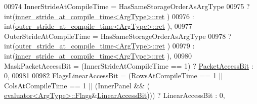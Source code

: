 \begin{DoxyCode}
00974     InnerStrideAtCompileTime = HasSameStorageOrderAsArgType
00975                              ? int(\hyperlink{struct_eigen_1_1internal_1_1inner__stride__at__compile__time}{inner\_stride\_at\_compile\_time<ArgType>::ret}
      )
00976                              : int(\hyperlink{struct_eigen_1_1internal_1_1outer__stride__at__compile__time}{outer\_stride\_at\_compile\_time<ArgType>::ret}
      ),
00977     OuterStrideAtCompileTime = HasSameStorageOrderAsArgType
00978                              ? int(\hyperlink{struct_eigen_1_1internal_1_1outer__stride__at__compile__time}{outer\_stride\_at\_compile\_time<ArgType>::ret}
      )
00979                              : int(\hyperlink{struct_eigen_1_1internal_1_1inner__stride__at__compile__time}{inner\_stride\_at\_compile\_time<ArgType>::ret}
      ),
00980     MaskPacketAccessBit = (InnerStrideAtCompileTime == 1) ? \hyperlink{group__flags_ga1a306a438e1ab074e8be59512e887b9f}{PacketAccessBit} : 0,
00981     
00982     FlagsLinearAccessBit = (RowsAtCompileTime == 1 || ColsAtCompileTime == 1 || (InnerPanel && (
      \hyperlink{struct_eigen_1_1internal_1_1evaluator}{evaluator<ArgType>::Flags}&\hyperlink{group__flags_ga4b983a15d57cd55806df618ac544d09e}{LinearAccessBit}))) ? LinearAccessBit : 0,
          

\end{DoxyCode}
